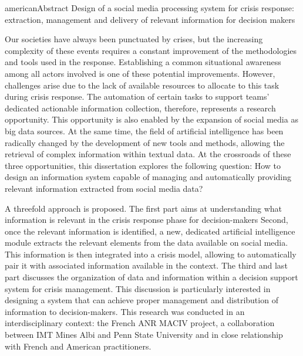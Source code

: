 {american}{Abstract}%
{Design of a social media processing system for crisis response: extraction, management and delivery of relevant information for decision makers}%
{
  Our societies have always been punctuated by crises, but the increasing complexity of these events requires a constant improvement of the methodologies and tools used in the response.
  Establishing a common situational awareness among all actors involved is one of these potential improvements.
  However, challenges arise due to the lack of available resources to allocate to this task during crisis response.
  The automation of certain tasks to support teams' dedicated actionable information collection, therefore, represents a research opportunity.
  This opportunity is also enabled by the expansion of social media as big data sources.
  At the same time, the field of artificial intelligence has been radically changed by the development of new tools and methods, allowing the retrieval of complex information within textual data.
  At the crossroads of these three opportunities, this dissertation explores the following question:
  How to design an information system capable of managing and automatically providing relevant information extracted from social media data?

  A threefold approach is proposed.
  The first part aims at understanding what information is relevant in the crisis response phase for decision-makers
  Second, once the relevant information is identified, a new, dedicated artificial intelligence
  module extracts the relevant elements from the data available on social media.
  This information is then integrated into a crisis model, allowing to automatically
  pair it with associated information available in the context.
  The third and last part discusses the organization of data and information within a decision support system for crisis management.
  This discussion is particularly interested in designing a system that can achieve proper management and distribution of information to decision-makers.
  This research was conducted in an interdisciplinary context: the French ANR MACIV project, a collaboration
  between IMT Mines Albi and Penn State University and in close relationship with French and American practitioners.

}

